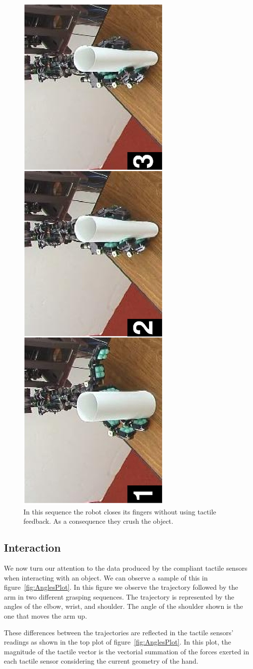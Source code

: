 \begin{figure}[tbp]
\centerline{
\includegraphics[height=\columnwidth, angle=270 ]{./figures/PaperNoGentle.eps}
} \caption[Crushing paper cylinder]{In this sequence the robot
closes its fingers without using tactile feedback. As a
consequence they crush the object.} \label{fig:PaperNoGentle}
\end{figure}


\subsection{Interaction}

We now turn our attention to the data produced by the compliant
tactile sensors when interacting with an object. We can observe a
sample of this in figure~\ref{fig:AnglesPlot}. In this figure we
observe the trajectory followed by the arm in two different
grasping sequences. The trajectory is represented by the angles of
the elbow, wrist, and shoulder. The angle of the shoulder shown is
the one that moves the arm up.

These differences between the trajectories are reflected in the
tactile sensors' readings as shown in the top plot of
figure~\ref{fig:AnglesPlot}. In this plot, the magnitude of the
tactile vector is the vectorial summation of the forces exerted in
each tactile sensor considering the current geometry of the hand.

